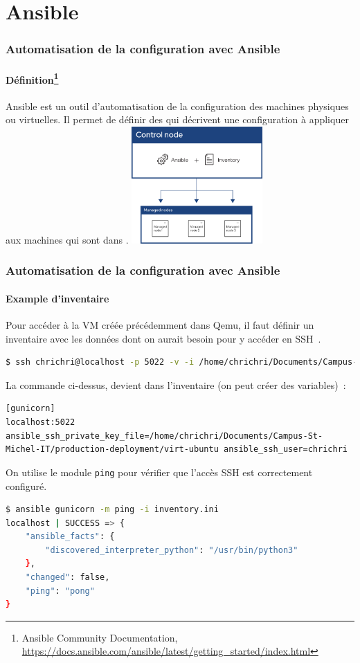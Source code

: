 \documentclass{beamer}
\begin{document}
    \section{Ansible}\label{sec:ansible}

    \begin{frame}
        \transdissolve
        \frametitle{Automatisation de la configuration avec Ansible}
        \framesubtitle{Définition\footnote{Ansible Community Documentation, \url{https://docs.ansible.com/ansible/latest/getting_started/index.html}}}
        Ansible est un outil d'automatisation de la configuration des machines physiques ou virtuelles.
        Il permet de définir des  qui décrivent une configuration à appliquer aux machines qui sont dans  .
        \bigbreak
        \centering
        \includegraphics[width=5cm]{image/ansible.png}
    \end{frame}

    \begin{frame}[fragile]
        \transdissolve
        \frametitle{Automatisation de la configuration avec Ansible}
        \framesubtitle{Example d'inventaire}
        Pour accéder à la VM créée précédemment dans Qemu, il faut définir un inventaire avec les données dont on aurait besoin pour y accéder en SSH~.
        \begin{lstlisting}[language=bash]
$ ssh chrichri@localhost -p 5022 -v -i /home/chrichri/Documents/Campus-St-Michel-IT/production-deployment/virt-ubuntu ansible_ssh_user=chrichri
        \end{lstlisting}
        La commande ci-dessus, devient dans l'inventaire (on peut créer des variables)~:
        \begin{lstlisting}
[gunicorn]
localhost:5022 ansible_ssh_private_key_file=/home/chrichri/Documents/Campus-St-Michel-IT/production-deployment/virt-ubuntu ansible_ssh_user=chrichri
        \end{lstlisting}
        On utilise le module \lstinline{ping} pour vérifier que l'accès SSH est correctement configuré.
        \begin{lstlisting}[language=bash]
$ ansible gunicorn -m ping -i inventory.ini
localhost | SUCCESS => {
    "ansible_facts": {
        "discovered_interpreter_python": "/usr/bin/python3"
    },
    "changed": false,
    "ping": "pong"
}
        \end{lstlisting}
    \end{frame}
\end{document}
